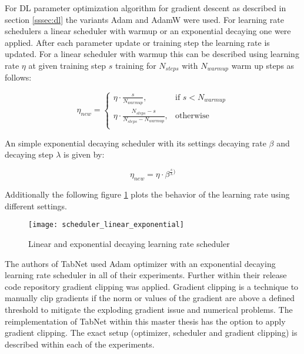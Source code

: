 \documentclass[../main.tex]{subfiles}
\begin{document}
For DL parameter optimization algorithm for gradient descent as described in section \ref{sssec:dl} the variants Adam \cite{kingma_adam_2017} and AdamW \cite{loshchilov_decoupled_2019} were used. For learning rate schedulers a linear scheduler with warmup or an exponential decaying one were applied. After each parameter update or training step the learning rate is updated. For a linear scheduler with warmup this can be described using learning rate $\eta$ at given training step $s$ training for $N_{steps}$ with $N_{warmup}$ warm up steps as follows:

\begin{equation}
	\eta_{new}=
    \begin{cases}
        \eta \cdot \frac{s}{N_{warmup}},& \text{if } s<N_{warmup} \\
        \eta \cdot \frac{N_{steps} - s}{N_{steps} - N_{warmup}},& \text{otherwise } \\
    \end{cases}	
\end{equation}

An simple exponential decaying scheduler with its settings decaying rate $\beta$ and decaying step $\lambda$ is given by:

\begin{equation}
	\eta_{new}=\eta \cdot \beta^{\frac{s}{\lambda})}
\end{equation}

Additionally the following figure \ref{fig:scheduler_linear_exponential} plots the behavior of the learning rate using different settings.

\begin{figure}[H]
    \centering
    \texttt{[image: scheduler\_linear\_exponential]}    
    \caption{Linear and exponential decaying learning rate scheduler}
    \label{fig:scheduler_linear_exponential}
\end{figure}

The authors of TabNet used Adam optimizer with an exponential decaying learning rate scheduler in all of their experiments. Further within their release code repository \cite{noauthor_google-researchtabnet_nodate} gradient clipping was applied. Gradient clipping is a technique to manually clip gradients if the norm or values of the gradient are above a defined threshold to mitigate the exploding gradient issue and numerical problems. The reimplementation of TabNet within this master thesis has the option to apply gradient clipping. The exact setup (optimizer, scheduler and gradient clipping) is described within each of the experiments. 
\end{document}
